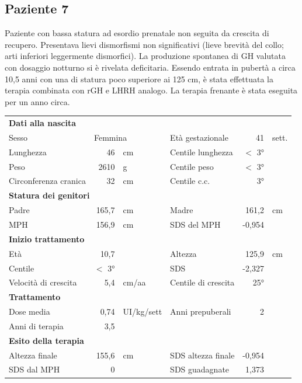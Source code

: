\subsection*{Paziente 7}%

Paziente con bassa statura ad esordio prenatale non seguita da crescita di recupero. Presentava lievi dismorfismi non significativi (lieve brevità del collo; arti inferiori leggermente dismorfici). La produzione spontanea di GH valutata con dosaggio notturno si è rivelata deficitaria. Essendo entrata in pubertà a circa 10,5 anni con una di statura poco superiore ai 125 cm, è stata effettuata la terapia combinata con rGH e LHRH analogo. La terapia frenante è stata eseguita per un anno circa. 

\begin{table}[!h]
\begin{tabular}{lrllrl}
\toprule
\multicolumn{6}{l}{\textbf{Dati alla nascita}}\\
Sesso 		& \multicolumn{2}{l}{Femmina} 	& Età gestazionale 		& 41 		& sett.\\
Lunghezza 	& 46 		& cm 				& Centile lunghezza		& $<$ 3° 		\\
Peso 		& 2610 		& g					& Centile peso			& $<$ 3° 		\\
Circonferenza cranica	& 32 		& cm 	& Centile c.c.			& 3° \\
\midrule
\multicolumn{6}{l}{\textbf{Statura dei genitori}}\\
Padre 		& 165,7 & cm 	& Madre 				& 161,2 & cm \\
MPH 		& 156,9 & cm 	& SDS del MPH 			& -0,954\\
\midrule
\multicolumn{6}{l}{\textbf{Inizio trattamento}} \\
Età	& 10,7 & 		& Altezza 				& 125,9 & cm  \\
Centile & $<$ 3° 	 &		& SDS		& -2,327 \\
Velocità di crescita & 5,4 & cm/aa	& Centile di crescita & 25°\\
\midrule
\multicolumn{6}{l}{\textbf{Trattamento}} \\
Dose media		& 0,74 & UI/kg/sett & Anni prepuberali & 2\\
Anni di terapia & 3,5\\
\midrule
\multicolumn{6}{l}{\textbf{Esito della terapia}} \\
Altezza finale			& 155,6 & cm 	& SDS altezza finale		& -0,954\\
SDS dal MPH				& 0 &		& SDS guadagnate 			& 1,373\\
\bottomrule
\end{tabular}
\end{table}
\clearpage

